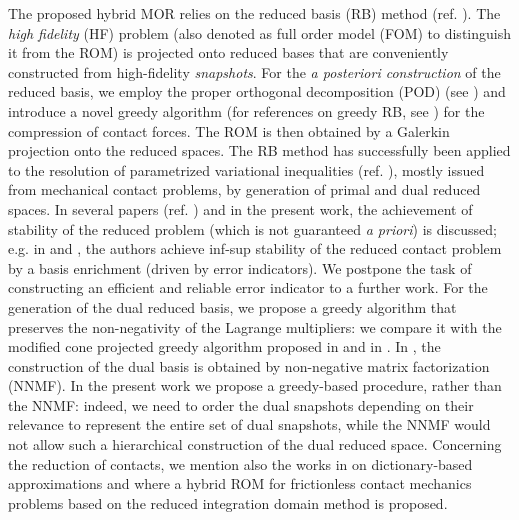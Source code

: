 The proposed hybrid MOR relies on the reduced basis (RB) method (ref. 
\cite{hesthaven2016certified, ngoc2005certified, prud2002reliable}). The \emph{high fidelity} (HF) problem (also denoted as full order model (FOM) to distinguish it from the ROM) is projected onto reduced bases that are conveniently constructed from high-fidelity \emph{snapshots}.
For the \emph{a posteriori construction} of the reduced basis, we employ the proper orthogonal decomposition (POD) (see \cite{aubry1991hidden, volkwein2011model,hesthaven2022reduced}) and introduce a novel greedy algorithm (for references on greedy RB, see \cite{prud2002reliable, veroy2003posteriori}) for the compression of 
contact forces. The ROM is then obtained by a Galerkin projection onto the reduced spaces. The RB method has successfully been applied to the resolution of parametrized variational inequalities (ref. \cite{benaceur2020reduced,haasdonk2012reduced,gerner2012certified,newsum2019efficient,niakh2023stable}), mostly issued from mechanical contact problems, by generation of primal and dual reduced spaces.  In several papers (ref. \cite{rozza2007stability,haasdonk2012reduced,haasdonk2012reduced,rozza2013reduced}) and in the present work, the achievement of stability of the reduced problem (which is not guaranteed \emph{a priori}) is discussed; e.g. in \cite{le2023error} and \cite{balajewicz2016projection}, the authors achieve inf-sup stability of the reduced contact problem by a basis enrichment (driven by error indicators). We postpone the task of constructing an efficient and reliable error indicator to a further work. 
For the generation of the dual reduced basis, we propose a greedy algorithm that preserves the non-negativity of the Lagrange multipliers: we compare it with the modified cone projected greedy algorithm proposed in \cite{niakh2023stable} and in \cite{benaceur2020reduced}.  In \cite{balajewicz2016projection}, the construction of the dual basis is obtained by non-negative matrix factorization (NNMF).  In the present work we propose a greedy-based procedure, rather than the NNMF: indeed, we need to order the dual snapshots depending on their relevance to represent the entire set of dual snapshots, while the NNMF would not allow such a hierarchical construction of the dual reduced space.  Concerning the reduction of contacts, we mention also the works in \cite{kollepara2024low, kollepara2024sparse} on dictionary-based approximations and \cite{fauque2018hybrid} where a hybrid ROM for frictionless contact mechanics problems based on the reduced integration domain method is proposed.\\
